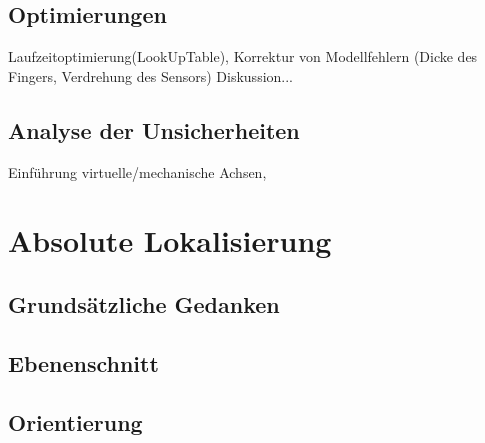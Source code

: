 \subsection{Optimierungen}
    Laufzeitoptimierung(LookUpTable), Korrektur von Modellfehlern (Dicke des Fingers, Verdrehung des Sensors)
    Diskussion...
	\subsection{Analyse der Unsicherheiten}
		Einführung virtuelle/mechanische Achsen,        

	\section{Absolute Lokalisierung}
		\subsection{Grundsätzliche Gedanken}
		\subsection{Ebenenschnitt}
		\subsection{Orientierung}
		

	
